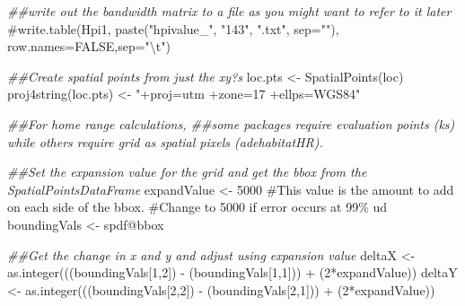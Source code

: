 \documentclass[
  letterpaper,
]{book}
\newenvironment{Shaded}{\begin{snugshade}}{\end{snugshade}}
\newcommand{\CommentTok}[1]{\textcolor[rgb]{0.37,0.37,0.37}{#1}}
\newcommand{\DecValTok}[1]{\textcolor[rgb]{0.68,0.00,0.00}{#1}}
\newcommand{\DocumentationTok}[1]{\textcolor[rgb]{0.37,0.37,0.37}{\textit{#1}}}
\newcommand{\FunctionTok}[1]{\textcolor[rgb]{0.28,0.35,0.67}{#1}}
\newcommand{\NormalTok}[1]{\textcolor[rgb]{0.00,0.23,0.31}{#1}}
\newcommand{\OtherTok}[1]{\textcolor[rgb]{0.00,0.23,0.31}{#1}}
\newcommand{\SpecialCharTok}[1]{\textcolor[rgb]{0.37,0.37,0.37}{#1}}
\newcommand{\StringTok}[1]{\textcolor[rgb]{0.13,0.47,0.30}{#1}}
\begin{document}
\begin{Shaded}
\begin{Highlighting}[]
\DocumentationTok{\#\#write out the bandwidth matrix to a file as you might want to refer to it later}
\CommentTok{\#write.table(Hpi1, paste("hpivalue\_", "143", ".txt", sep=""), row.names=FALSE,sep="\textbackslash{}t")}

\DocumentationTok{\#\#Create spatial points from just the xy?s}
\NormalTok{loc.pts }\OtherTok{\textless{}{-}} \FunctionTok{SpatialPoints}\NormalTok{(loc)}
\FunctionTok{proj4string}\NormalTok{(loc.pts) }\OtherTok{\textless{}{-}} \StringTok{"+proj=utm +zone=17 +ellps=WGS84"}

\DocumentationTok{\#\#For home range calculations, \#\#some packages require evaluation points (ks) while others require grid as spatial pixels (adehabitatHR).}

\DocumentationTok{\#\#Set the expansion value for the grid and get the bbox from the SpatialPointsDataFrame}
\NormalTok{expandValue }\OtherTok{\textless{}{-}} \DecValTok{5000} \CommentTok{\#This value is the amount to add on each side of the bbox.}
\CommentTok{\#Change to 5000 if error occurs at 99\% ud}
\NormalTok{boundingVals }\OtherTok{\textless{}{-}}\NormalTok{ spdf}\SpecialCharTok{@}\NormalTok{bbox}

\DocumentationTok{\#\#Get the change in x and y and adjust using expansion value}
\NormalTok{deltaX }\OtherTok{\textless{}{-}} \FunctionTok{as.integer}\NormalTok{(((boundingVals[}\DecValTok{1}\NormalTok{,}\DecValTok{2}\NormalTok{]) }\SpecialCharTok{{-}}\NormalTok{ (boundingVals[}\DecValTok{1}\NormalTok{,}\DecValTok{1}\NormalTok{])) }\SpecialCharTok{+}\NormalTok{ (}\DecValTok{2}\SpecialCharTok{*}\NormalTok{expandValue))}
\NormalTok{deltaY }\OtherTok{\textless{}{-}} \FunctionTok{as.integer}\NormalTok{(((boundingVals[}\DecValTok{2}\NormalTok{,}\DecValTok{2}\NormalTok{]) }\SpecialCharTok{{-}}\NormalTok{ (boundingVals[}\DecValTok{2}\NormalTok{,}\DecValTok{1}\NormalTok{])) }\SpecialCharTok{+}\NormalTok{ (}\DecValTok{2}\SpecialCharTok{*}\NormalTok{expandValue))}


\end{Highlighting}
\end{Shaded}
\end{document}
